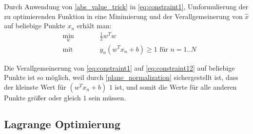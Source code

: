 \documentclass[a4paper,11pt,twoside]{scrreprt}
\begin{document}
Durch Anwendung von \autoref{abs_value_trick} in \autoref{eq:constraint1}, Umformulierung der zu optimierenden Funktion in eine Minimierung und der Verallgemeinerung von $\hat{x}$ auf beliebige Punkte $x_{n}$ erhält man:
\begin{subequations}
	\begin{alignat}{2}
		&\!\min_{w}        &\qquad&  \frac{1}{2} w^{T} w \label{eq:optProb2}\\
		&\text{mit } &      & y_n (w^{T} x_{n} + b) \geq 1 \text{ für } n=1..N \label{eq:constraint12}
	\end{alignat}
\end{subequations}

Die Verallgemeinerung von \autoref{eq:constraint1} auf \autoref{eq:constraint12} auf beliebige Punkte ist so möglich, weil durch \autoref{plane_normalization} sichergestellt ist, dass der kleinste Wert für $(w^{T} x_{n} + b)$ $1$ ist, und somit die Werte für alle anderen Punkte größer oder gleich $1$ sein müssen. \\

\subsection{Lagrange Optimierung}





\clearpage
{}
{}
\printbibliography
\end{document}
